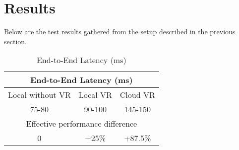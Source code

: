 \section{Results}
Below are the test results gathered from the setup described in the previous section.

\begin{table}[h]
\begin{center}
\begin{tabular}{ |c|c|c| }
\hline
\multicolumn{3}{|c|}{End-to-End Latency (ms)}\\
\hline
Local without VR & Local VR & Cloud VR\\
\hline
75-80 & 90-100 & 145-150\\
\hline
\multicolumn{3}{|c|}{Effective performance difference}\\
\hline
0 & +25\% & +87.5\%\\
\hline
\end{tabular}
\end{center}
\caption{End-to-End Latency (ms)}
\end{table}